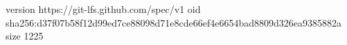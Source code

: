 version https://git-lfs.github.com/spec/v1
oid sha256:d37f07b58f12d99ed7ce88098d71e8cde66ef4e6654bad8809d326ea9385882a
size 1225
